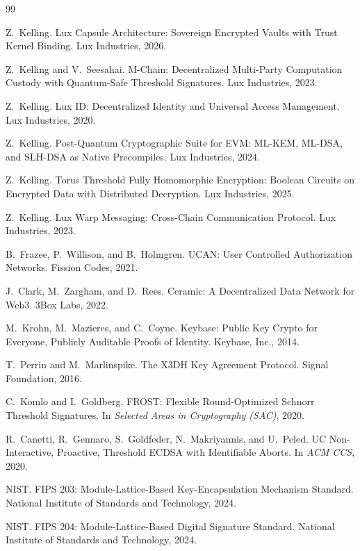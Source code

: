 \documentclass[11pt,a4paper]{article}
\begin{document}
\begin{thebibliography}{99}

Z.~Kelling.
\newblock Lux Capsule Architecture: Sovereign Encrypted Vaults with Trust Kernel Binding.
\newblock Lux Industries, 2026.

Z.~Kelling and V.~Seesahai.
\newblock M-Chain: Decentralized Multi-Party Computation Custody with Quantum-Safe Threshold Signatures.
\newblock Lux Industries, 2023.

Z.~Kelling.
\newblock Lux ID: Decentralized Identity and Universal Access Management.
\newblock Lux Industries, 2020.

Z.~Kelling.
\newblock Post-Quantum Cryptographic Suite for EVM: ML-KEM, ML-DSA, and SLH-DSA as Native Precompiles.
\newblock Lux Industries, 2024.

Z.~Kelling.
\newblock Torus Threshold Fully Homomorphic Encryption: Boolean Circuits on Encrypted Data with Distributed Decryption.
\newblock Lux Industries, 2025.

Z.~Kelling.
\newblock Lux Warp Messaging: Cross-Chain Communication Protocol.
\newblock Lux Industries, 2023.

B.~Frazee, P.~Willison, and B.~Holmgren.
\newblock UCAN: User Controlled Authorization Networks.
\newblock Fission Codes, 2021.

J.~Clark, M.~Zargham, and D.~Rees.
\newblock Ceramic: A Decentralized Data Network for Web3.
\newblock 3Box Labs, 2022.

M.~Krohn, M.~Mazieres, and C.~Coyne.
\newblock Keybase: Public Key Crypto for Everyone, Publicly Auditable Proofs of Identity.
\newblock Keybase, Inc., 2014.

T.~Perrin and M.~Marlinspike.
\newblock The X3DH Key Agreement Protocol.
\newblock Signal Foundation, 2016.

C.~Komlo and I.~Goldberg.
\newblock FROST: Flexible Round-Optimized Schnorr Threshold Signatures.
\newblock In \emph{Selected Areas in Cryptography (SAC)}, 2020.

R.~Canetti, R.~Gennaro, S.~Goldfeder, N.~Makriyannis, and U.~Peled.
\newblock UC Non-Interactive, Proactive, Threshold ECDSA with Identifiable Aborts.
\newblock In \emph{ACM CCS}, 2020.

NIST.
\newblock FIPS 203: Module-Lattice-Based Key-Encapsulation Mechanism Standard.
\newblock National Institute of Standards and Technology, 2024.

NIST.
\newblock FIPS 204: Module-Lattice-Based Digital Signature Standard.
\newblock National Institute of Standards and Technology, 2024.

\end{thebibliography}
\end{document}
